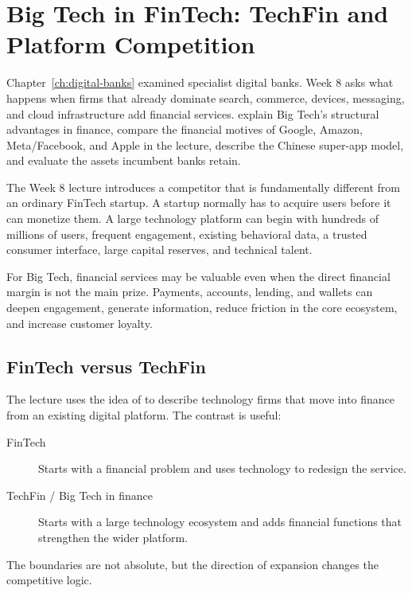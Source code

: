 \chapter{Big Tech in FinTech: TechFin and Platform Competition}
\label{ch:bigtech}

\chapterguide%
  {Chapter~\ref{ch:digital-banks} examined specialist digital banks. Week 8 asks what happens when firms that already dominate search, commerce, devices, messaging, and cloud infrastructure add financial services.}
  {explain Big Tech's structural advantages in finance, compare the financial motives of Google, Amazon, Meta/Facebook, and Apple in the lecture, describe the Chinese super-app model, and evaluate the assets incumbent banks retain.}

The Week 8 lecture introduces a competitor that is fundamentally different from an ordinary FinTech startup. A startup normally has to acquire users before it can monetize them. A large technology platform can begin with hundreds of millions of users, frequent engagement, existing behavioral data, a trusted consumer interface, large capital reserves, and technical talent.

\begin{keyidea}
For Big Tech, financial services may be valuable even when the direct financial margin is not the main prize. Payments, accounts, lending, and wallets can deepen engagement, generate information, reduce friction in the core ecosystem, and increase customer loyalty.
\end{keyidea}

\section{FinTech versus TechFin}

The lecture uses the idea of  to describe technology firms that move into finance from an existing digital platform. The contrast is useful:

\begin{description}
  \item[FinTech] Starts with a financial problem and uses technology to redesign the service.
  \item[TechFin / Big Tech in finance] Starts with a large technology ecosystem and adds financial functions that strengthen the wider platform.
\end{description}

The boundaries are not absolute, but the direction of expansion changes the competitive logic.

